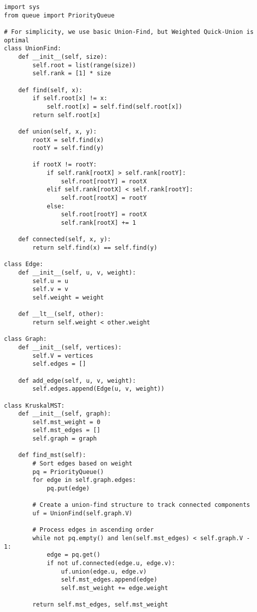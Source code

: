\documentclass{article}
\begin{document}
\begin{verbatim}
import sys
from queue import PriorityQueue

# For simplicity, we use basic Union-Find, but Weighted Quick-Union is optimal
class UnionFind:
    def __init__(self, size):
        self.root = list(range(size))
        self.rank = [1] * size

    def find(self, x):
        if self.root[x] != x:
            self.root[x] = self.find(self.root[x])
        return self.root[x]

    def union(self, x, y):
        rootX = self.find(x)
        rootY = self.find(y)

        if rootX != rootY:
            if self.rank[rootX] > self.rank[rootY]:
                self.root[rootY] = rootX
            elif self.rank[rootX] < self.rank[rootY]:
                self.root[rootX] = rootY
            else:
                self.root[rootY] = rootX
                self.rank[rootX] += 1

    def connected(self, x, y):
        return self.find(x) == self.find(y)

class Edge:
    def __init__(self, u, v, weight):
        self.u = u
        self.v = v
        self.weight = weight

    def __lt__(self, other):
        return self.weight < other.weight

class Graph:
    def __init__(self, vertices):
        self.V = vertices
        self.edges = []

    def add_edge(self, u, v, weight):
        self.edges.append(Edge(u, v, weight))

class KruskalMST:
    def __init__(self, graph):
        self.mst_weight = 0
        self.mst_edges = []
        self.graph = graph

    def find_mst(self):
        # Sort edges based on weight
        pq = PriorityQueue()
        for edge in self.graph.edges:
            pq.put(edge)

        # Create a union-find structure to track connected components
        uf = UnionFind(self.graph.V)

        # Process edges in ascending order
        while not pq.empty() and len(self.mst_edges) < self.graph.V - 1:
            edge = pq.get()
            if not uf.connected(edge.u, edge.v):
                uf.union(edge.u, edge.v)
                self.mst_edges.append(edge)
                self.mst_weight += edge.weight

        return self.mst_edges, self.mst_weight
\end{verbatim}
\end{document}
